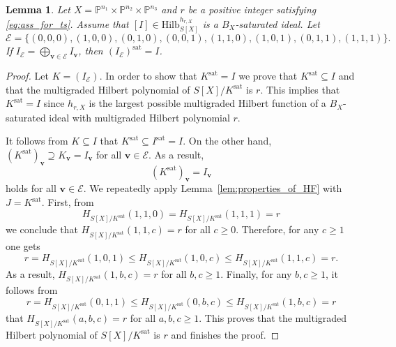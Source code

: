 \documentclass[12pt]{amsart}
\newtheorem{lemma}[theorem]{Lemma}
\theoremstyle{definition}
\theoremstyle{remark}
\theoremstyle{definition}
\newcommand{\vv}{\mathbf{v}}
\newcommand{\sat}{\mathrm{sat}}
\newcommand{\HF}[2]{H_{#1}(#2)}
\newcommand{\Hilb}{\mathrm{Hilb}}
\begin{document}
\begin{lemma}\label{lem:is_injective}
    Let $X=\mathbb{P}^{n_1}\times \mathbb{P}^{n_2}\times \mathbb{P}^{n_3}$ and $r$ be a positive integer satisfying \eqref{eq:ass_for_ts}. Assume that $[I] \in \Hilb_{S[X]}^{h_{r,X}}$ is a $B_X$-saturated ideal. Let 
    \begin{equation}\label{eq:E}
    \mathcal{E} = \{(0,0,0), (1,0,0), (0,1,0), (0,0,1), (1,1,0), (1,0,1), (0,1,1), (1,1,1)\}.
    \end{equation}
    If $I_\mathcal{E} = \bigoplus_{\vv\in \mathcal{E}}I_{\vv}$, then $(I_\mathcal{E})^{\sat} = I$.
\end{lemma}
\begin{proof}
Let $K = (I_\mathcal{E})$. In order to show that $K^{\sat} = I$ we prove that $K^{\sat}\subseteq I$ and that the multigraded Hilbert polynomial of $S[X]/K^{\sat}$ is $r$. This implies that $K^{\sat} = I$ since $h_{r,X}$ is the largest possible multigraded Hilbert function of a $B_X$-saturated ideal with multigraded Hilbert polynomial $r$. 

It follows from $K\subseteq I$ that $K^{\sat} \subseteq I^{\sat} = I$.
On the other hand, $(K^{\sat})_\vv \supseteq K_\vv = I_\vv$ for all $\vv\in \mathcal{E}$. As a result,
\[
(K^{\sat})_\vv = I_\vv
\]
holds for all $\vv \in \mathcal{E}$.
We repeatedly apply Lemma~\ref{lem:properties_of_HF} with $J = K^{\sat}$.
First, from 
\[
\HF{S[X]/K^{\sat}}{1,1,0} = \HF{S[X]/K^{\sat}}{1,1,1} = r
\]
we conclude that $\HF{S[X]/K^{\sat}}{1,1,c} = r$ for all $c\geq 0$. Therefore, for any $c\geq 1$ one gets
\[
r = \HF{S[X]/K^{\sat}}{1,0,1} \leq \HF{S[X]/K^{\sat}}{1,0,c} \leq \HF{S[X]/K^{\sat}}{1,1,c} = r.
\]
As a result, $\HF{S[X]/K^{\sat}}{1,b,c} = r$ for all $b,c\geq 1$.
Finally, for any $b,c\geq 1$, it follows from
\[
r = \HF{S[X]/K^{\sat}}{0,1,1} \leq \HF{S[X]/K^{\sat}}{0,b,c} \leq \HF{S[X]/K^{\sat}}{1,b,c} = r
\]
that $\HF{S[X]/K^{\sat}}{a,b,c} = r$ for all $a,b,c\geq 1$.
This proves that the multigraded Hilbert polynomial of $S[X]/K^{\sat}$ is $r$ and finishes the proof.
\end{proof}
\end{document}
